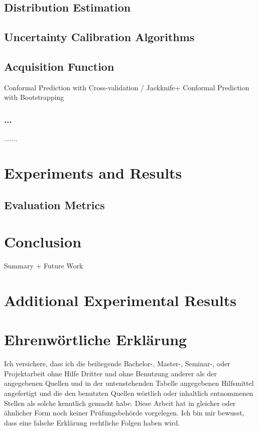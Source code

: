 \documentclass[a4paper,oneside,bibliography=totoc]{scrbook}
\begin{document}
\section{Distribution Estimation}
\label{sec:distest}
\section{Uncertainty Calibration Algorithms}
\section{Acquisition Function}



{Conformal Prediction with Cross-validation / Jackknife+}
{Conformal Prediction with Bootstrapping}
\subsection{...}
.......

\chapter{Experiments and Results}

\section{Evaluation Metrics}

\label{Results}

\chapter{Conclusion}
\label{Conclude}
Summary + Future Work




\appendix
\chapter{Additional Experimental Results}


\backmatter
\chapter{Ehrenwörtliche Erklärung}
Ich versichere, dass ich die beiliegende Bachelor-, Master-, Seminar-, oder
Projektarbeit ohne Hilfe Dritter und ohne Benutzung anderer als der angegebenen
Quellen und in der untenstehenden Tabelle angegebenen Hilfsmittel angefertigt
und die den benutzten Quellen wörtlich oder inhaltlich entnommenen Stellen als
solche kenntlich gemacht habe. Diese Arbeit hat in gleicher oder ähnlicher Form
noch keiner Prüfungsbehörde vorgelegen. Ich bin mir bewusst, dass eine falsche
Erklärung rechtliche Folgen haben wird.
\end{document}
